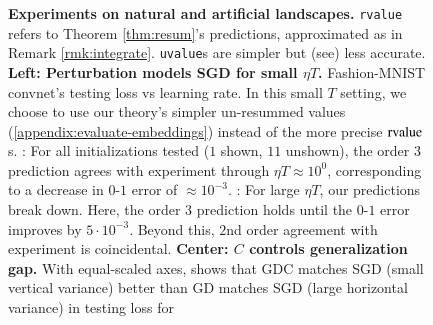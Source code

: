             \begin{figure}[h!] 
                \centering
                 \hfill {}          \hfill {}
                 \hfill {} \hfill {}
                \caption{
                    {\bf Experiments on natural and artificial landscapes.}
                    \texttt{rvalue} refers to Theorem \ref{thm:resum}'s
                    predictions, approximated as in Remark \ref{rmk:integrate}.
                    \texttt{uvalue}s are
                    simpler but (see\protect{})
                    less accurate.
                    \newline
                    {\bf Left: Perturbation models SGD for small $\eta
                    T$.} Fashion-MNIST convnet's testing loss vs learning rate.
                    In this small $T$ setting, we choose to use our theory's
                    simpler un-resummed values
                    (\ref{appendix:evaluate-embeddings}) instead of the more
                    precise $\text{\textnormal{rvalue}}$s.
                    \protect{}: For all initializations tested ($1$
                    shown, $11$ unshown), the order $3$ prediction agrees with
                    experiment through $\eta T \approx 10^0$, corresponding to
                    a decrease in $0\mbox{-}1$ error of $\approx 10^{-3}$.
                    \protect{}: For large $\eta T$, our predictions
                    break down.  Here, the order $3$ prediction holds until the
                    $0\mbox{-}1$ error improves by $5\cdot 10^{-3}$.  Beyond
                    this, $2$nd order agreement with experiment is
                    coincidental.  
                    \newline
                    {\bf Center: $C$ controls generalization gap.}%
                    With equal-scaled axes, \protect{} shows that GDC
                    matches SGD (small vertical variance) better than GD
                    matches SGD (large horizontal variance) in testing loss for
}
\end{figure}
